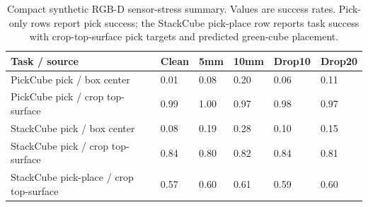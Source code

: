\begin{table}[t]
\centering
\caption{Compact synthetic RGB-D sensor-stress summary. Values are success
rates. Pick-only rows report pick success; the StackCube pick-place row reports
task success with crop-top-surface pick targets and predicted green-cube
placement.}
\label{tab:sensor-stress-compact}
\small
\begin{tabular}{llllll}
\toprule
Task / source & Clean & 5mm & 10mm & Drop10 & Drop20 \\
\midrule
PickCube pick / box center & 0.01 & 0.08 & 0.20 & 0.06 & 0.11 \\
PickCube pick / crop top-surface & 0.99 & 1.00 & 0.97 & 0.98 & 0.97 \\
StackCube pick / box center & 0.08 & 0.19 & 0.28 & 0.10 & 0.15 \\
StackCube pick / crop top-surface & 0.84 & 0.80 & 0.82 & 0.84 & 0.81 \\
StackCube pick-place / crop top-surface & 0.57 & 0.60 & 0.61 & 0.59 & 0.60 \\
\bottomrule
\end{tabular}
\end{table}
